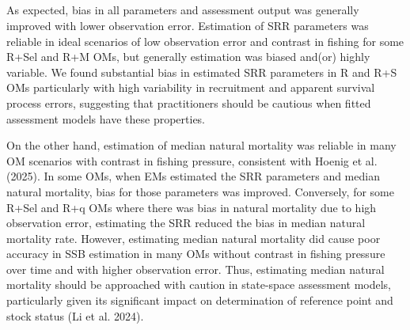 \documentclass[
  12pt,
]{article}
\providecommand{\DIFadd}[1]{{\protect\color{blue}\uwave{#1}}} %
\providecommand{\DIFaddbegin}{} %
\providecommand{\DIFaddend}{} %
\providecommand{\DIFdelbegin}{} %
\providecommand{\DIFdelend}{} %
\newcommand{\DIFscaledelfig}{0.5}
\newlength{\DIFdelgraphicswidth} %
\newlength{\DIFdelgraphicsheight} %
\newcommand{\DIFaddincludegraphics}[2][]{{\color{blue}\fbox{\DIFOincludegraphics[#1]{#2}}}} %
\newcommand{\DIFdelincludegraphics}[2][]{%
\sbox{\DIFdelgraphicsbox}{\DIFOincludegraphics[#1]{#2}}%
\settoboxwidth{\DIFdelgraphicswidth}{\DIFdelgraphicsbox} %
\settoboxtotalheight{\DIFdelgraphicsheight}{\DIFdelgraphicsbox} %
\scalebox{\DIFscaledelfig}{%
\parbox[b]{\DIFdelgraphicswidth}{\usebox{\DIFdelgraphicsbox}\\[-\baselineskip] \rule{\DIFdelgraphicswidth}{0em}}\llap{\resizebox{\DIFdelgraphicswidth}{\DIFdelgraphicsheight}{%
\setlength{\unitlength}{\DIFdelgraphicswidth}%
\begin{picture}(1,1)%
\thicklines\linethickness{2pt} %
{\color[rgb]{1,0,0}\put(0,0){\framebox(1,1){}}}%
{\color[rgb]{1,0,0}\put(0,0){\line( 1,1){1}}}%
{\color[rgb]{1,0,0}\put(0,1){\line(1,-1){1}}}%
\end{picture}%
}\hspace*{3pt}}} %
} %
\DeclareRobustCommand{\DIFaddbegin}{\DIFOaddbegin \let\includegraphics\DIFaddincludegraphics} %
\DeclareRobustCommand{\DIFaddend}{\DIFOaddend \let\includegraphics\DIFOincludegraphics} %
\DeclareRobustCommand{\DIFdelbegin}{\DIFOdelbegin \let\includegraphics\DIFdelincludegraphics} %
\DeclareRobustCommand{\DIFdelend}{\DIFOaddend \let\includegraphics\DIFOincludegraphics} %
\begin{document}
\DIFdelbegin %
\DIFdelend \DIFaddbegin \subsection*{\DIFadd{Bias}}\label{bias-2}
\DIFaddend {}

As expected, bias in all parameters and assessment output was generally
improved with lower observation error. Estimation of SRR parameters was
reliable in ideal scenarios of low observation error and contrast in
fishing for some R+Sel and R+M OMs, but generally estimation was biased
and(or) highly variable. We found substantial bias in estimated SRR
parameters in R and R+S OMs particularly with high variability in
recruitment and apparent survival process errors, suggesting that
practitioners should be cautious when fitted assessment models have
these properties.

On the other hand, estimation of median natural mortality was reliable
in many OM scenarios with contrast in fishing pressure, consistent with
Hoenig et al. (2025). In some OMs, when EMs estimated the SRR parameters
and median natural mortality, bias for those parameters was improved.
Conversely, for some R+Sel and R+q OMs where there was bias in natural
mortality due to high observation error, estimating the SRR reduced the
bias in median natural mortality rate. However, estimating median
natural mortality did cause poor accuracy in SSB estimation in many OMs
without contrast in fishing pressure over time and with higher
observation error. Thus, estimating median natural mortality should be
approached with caution in state-space assessment models, particularly
given its significant impact on determination of reference point and
stock status (Li et al. 2024).

\DIFdelbegin %
\DIFdelend \DIFaddbegin \subsection*{\DIFadd{Retrospective patterns}}\label{retrospective-patterns}
\DIFaddend {}
\end{document}
